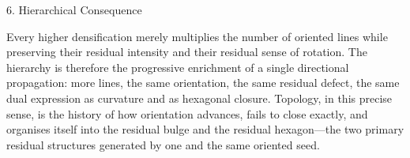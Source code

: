 6. Hierarchical Consequence

Every higher densification merely multiplies the number of oriented lines while preserving their residual intensity and their residual sense of rotation. The hierarchy is therefore the progressive enrichment of a single directional propagation: more lines, the same orientation, the same residual defect, the same dual expression as curvature and as hexagonal closure. Topology, in this precise sense, is the history of how orientation advances, fails to close exactly, and organises itself into the residual bulge and the residual hexagon—the two primary residual structures generated by one and the same oriented seed.
